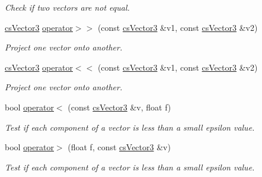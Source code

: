 \begin{DoxyCompactItemize}
\begin{DoxyCompactList}\small\item\em Check if two vectors are not equal. \end{DoxyCompactList}\item 
\hyperlink{classcsVector3}{cs\+Vector3} \hyperlink{classcsVector3_a457aa88a73812661db71dac5aa422799}{operator$>$$>$} (const \hyperlink{classcsVector3}{cs\+Vector3} \&v1, const \hyperlink{classcsVector3}{cs\+Vector3} \&v2)\hypertarget{classcsVector3_a457aa88a73812661db71dac5aa422799}{}\label{classcsVector3_a457aa88a73812661db71dac5aa422799}

\begin{DoxyCompactList}\small\item\em Project one vector onto another. \end{DoxyCompactList}\item 
\hyperlink{classcsVector3}{cs\+Vector3} \hyperlink{classcsVector3_a5a6e8a9dd6eb45cf808d1f11e85e8a05}{operator$<$$<$} (const \hyperlink{classcsVector3}{cs\+Vector3} \&v1, const \hyperlink{classcsVector3}{cs\+Vector3} \&v2)\hypertarget{classcsVector3_a5a6e8a9dd6eb45cf808d1f11e85e8a05}{}\label{classcsVector3_a5a6e8a9dd6eb45cf808d1f11e85e8a05}

\begin{DoxyCompactList}\small\item\em Project one vector onto another. \end{DoxyCompactList}\item 
bool \hyperlink{classcsVector3_a6e1bbeabb9f0f71d3a0816111006c897}{operator$<$} (const \hyperlink{classcsVector3}{cs\+Vector3} \&v, float f)\hypertarget{classcsVector3_a6e1bbeabb9f0f71d3a0816111006c897}{}\label{classcsVector3_a6e1bbeabb9f0f71d3a0816111006c897}

\begin{DoxyCompactList}\small\item\em Test if each component of a vector is less than a small epsilon value. \end{DoxyCompactList}\item 
bool \hyperlink{classcsVector3_ab810d5c75c97a7119cc48f9efb4cfa19}{operator$>$} (float f, const \hyperlink{classcsVector3}{cs\+Vector3} \&v)\hypertarget{classcsVector3_ab810d5c75c97a7119cc48f9efb4cfa19}{}\label{classcsVector3_ab810d5c75c97a7119cc48f9efb4cfa19}

\begin{DoxyCompactList}\small\item\em Test if each component of a vector is less than a small epsilon value. \end{DoxyCompactList}\end{DoxyCompactItemize}


